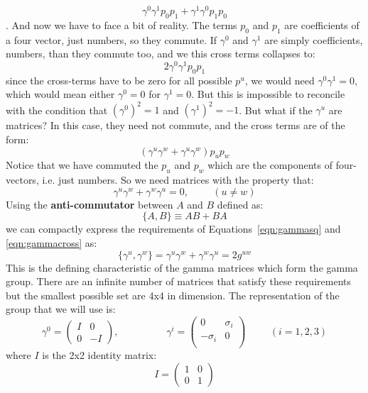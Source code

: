 \documentclass[12pt]{book}
\begin{document}
$$\gamma^0 \gamma^1 p_0 p_1 + \gamma^1 \gamma^0 p_1 p_0$$.
And now we have to face a bit of reality.  The terms $p_0$ and $p_1$ are coefficients of a four vector, just numbers, so they commute.  If $\gamma^0$ and $\gamma^1$ are simply coefficients, numbers, than they commute too, and we this cross terms collapses to:
$$2 \gamma^0 \gamma^1 p_0 p_1$$
since the cross-terms have to be zero for all possible $p^u$, we would need $\gamma^0 \gamma^1 = 0$, which would mean either $\gamma^0 = 0$ for $\gamma^1=0$.  But this is impossible to reconcile with the condition that $(\gamma^0)^2 = 1$ and $(\gamma^1)^2 = -1$.
But what if the $\gamma^u$ are matrices?  In this case, they need not commute, and the cross terms are of the form:
$$(\gamma^u \gamma^w + \gamma^u \gamma^w) p_u p_w$$
Notice that we have commuted the $p_u$ and $p_w$ which are the components of four-vectors, i.e. just numbers.  So we need matrices with the property that:
\begin{equation}
\label{eqn:gammacross}
\gamma^u \gamma^w + \gamma^w \gamma^u = 0, \hspace{1cm} (u \neq w)
\end{equation}
Using the {\bf anti-commutator} between $A$ and $B$ defined as:
$$\{A, B\} \equiv A B + B A$$
we can compactly express the requirements of Equations~\ref{eqn:gammasq} and \ref{eqn:gammacross} as:
\begin{equation}
\label{eqn:gammaanti}
\{\gamma^u, \gamma^w\} = \gamma^u \gamma^w + \gamma^w \gamma^u = 2 g^{uw}
\end{equation}
This is the defining characteristic of the gamma matrices which form the gamma group.  There are an infinite number of matrices that satisfy these requirements 
but the smallest possible set are 4x4 in dimension.  The representation of the group that we will use is:
\begin{equation}
\label{eqn:gammamats}
\gamma^0 = \begin{pmatrix} I & 0 \\ 0 & -I \end{pmatrix}, \hspace{2cm}
\gamma^i = \begin{pmatrix} 0 & \sigma_i \\ -\sigma_i & 0 \\ \end{pmatrix}
\hspace{1cm} (i=1,2,3)
\end{equation}
where $I$ is the 2x2 identity matrix:
$$I = \begin{pmatrix} 1 & 0 \\ 0 & 1 \end{pmatrix} $$
\end{document}

